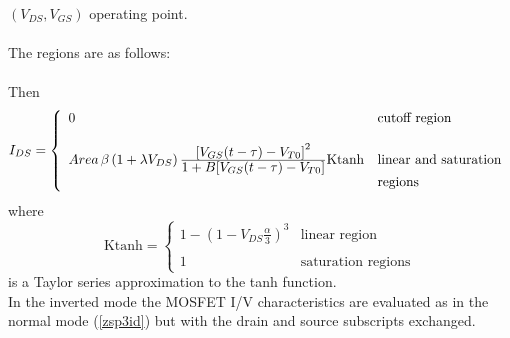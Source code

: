 $(V_{DS}, V_{GS})$ operating point.\\[0.1in]
\\[0.2in]
The regions are as follows:\\[0.1in]
\hspace*{\fill}\\[0.1in]
Then
\begin{equation}
I_{DS} = \left\{ \begin{array}{ll}
      0  & \mbox{cutoff region} \\ \\
      Area\,\beta
      \left(1 + \lambda V_{DS}\right)
      {{\textstyle\left[V_{GS}(t-\tau)-V_{T0}\right]^2}\over
      {\textstyle 1 + B[{V_{GS}(t-\tau)-V_{T0}]}}}
      \mbox{Ktanh}
         &\mbox{linear and saturation}\\
         &\mbox{regions} \end{array} \right. %
      \label{zsp3id}
\end{equation}
where
\begin{equation}
\mbox{Ktanh} = \left\{ \begin{array}{ll}
       1 - \left(1 - V_{DS} \frac{\alpha}{3}\right)^3
        & \mbox{linear region} \\ \\
      1
         &\mbox{saturation regions} \end{array} \right. %
\end{equation}
is a Taylor series approximation to the tanh function.
\\[0.2in]
In the inverted mode the MOSFET I/V characteristics are evaluated
as in the normal mode (\ref{zsp3id}) but with the drain and source
subscripts exchanged.\\
